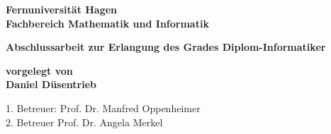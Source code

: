 \documentclass[12pt, parskip=half]{scrreprt}
\begin{document}
\begin{titlepage}
{\bfseries\Large Fernuniversität Hagen \\
Fachbereich Mathematik und Informatik}

\vspace*{4cm}
\begin{center}
\bfseries\Large Abschlussarbeit zur Erlangung des Grades Diplom-Informatiker
\end{center}

\vspace*{2cm}
\begin{center}
\bfseries\Large vorgelegt von \\ Daniel Düsentrieb
\end{center}

\vfill
1. Betreuer: Prof. Dr. Manfred Oppenheimer \\
2. Betreuer Prof. Dr. Angela Merkel 
\end{titlepage}



\tableofcontents

\listoffigures

\listoftables






\end{document}
